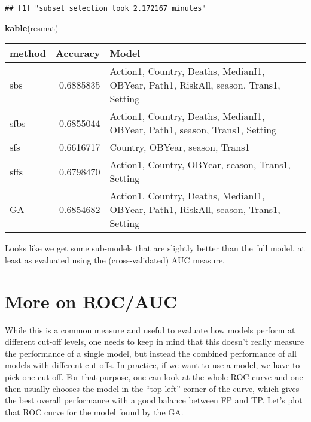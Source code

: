 \documentclass[]{article}
\newenvironment{Shaded}{\begin{snugshade}}{\end{snugshade}}
\newcommand{\CommentTok}[1]{\textcolor[rgb]{0.56,0.35,0.01}{\textit{#1}}}
\newcommand{\DataTypeTok}[1]{\textcolor[rgb]{0.13,0.29,0.53}{#1}}
\newcommand{\DecValTok}[1]{\textcolor[rgb]{0.00,0.00,0.81}{#1}}
\newcommand{\KeywordTok}[1]{\textcolor[rgb]{0.13,0.29,0.53}{\textbf{#1}}}
\newcommand{\NormalTok}[1]{#1}
\newcommand{\OperatorTok}[1]{\textcolor[rgb]{0.81,0.36,0.00}{\textbf{#1}}}
\newcommand{\StringTok}[1]{\textcolor[rgb]{0.31,0.60,0.02}{#1}}
\begin{document}
\begin{verbatim}
## [1] "subset selection took 2.172167 minutes"
\end{verbatim}

\begin{Shaded}
\begin{Highlighting}[]
\KeywordTok{kable}\NormalTok{(resmat)}
\end{Highlighting}
\end{Shaded}

\begin{longtable}[]{@{}lrl@{}}
\toprule
method & Accuracy & Model\tabularnewline
\midrule
\endhead
sbs & 0.6885835 & Action1, Country, Deaths, MedianI1, OBYear, Path1,
RiskAll, season, Trans1, Setting\tabularnewline
sfbs & 0.6855044 & Action1, Country, Deaths, MedianI1, OBYear, Path1,
season, Trans1, Setting\tabularnewline
sfs & 0.6616717 & Country, OBYear, season, Trans1\tabularnewline
sffs & 0.6798470 & Action1, Country, OBYear, season, Trans1,
Setting\tabularnewline
GA & 0.6854682 & Action1, Country, Deaths, MedianI1, OBYear, Path1,
RiskAll, season, Trans1, Setting\tabularnewline
\bottomrule
\end{longtable}

Looks like we get some sub-models that are slightly better than the full
model, at least as evaluated using the (cross-validated) AUC measure.

\hypertarget{more-on-rocauc}{%
\section{More on ROC/AUC}\label{more-on-rocauc}}

While this is a common measure and useful to evaluate how models perform
at different cut-off levels, one needs to keep in mind that this doesn't
really measure the performance of a single model, but instead the
combined performance of all models with different cut-offs. In practice,
if we want to use a model, we have to pick one cut-off. For that
purpose, one can look at the whole ROC curve and one then usually
chooses the model in the ``top-left'' corner of the curve, which gives
the best overall performance with a good balance between FP and TP.
Let's plot that ROC curve for the model found by the GA.

\begin{Shaded}
\end{Shaded}
\end{document}
